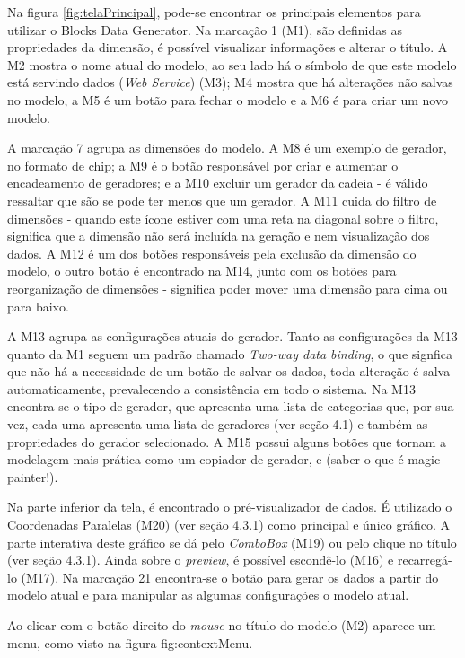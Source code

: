 \documentclass[
	12pt,				%
	openright,			%
	twoside,			%
	a4paper,			%
	english,			%
	brazil				%
	]{abntex2}
\begin{document}
		\par
		Na figura \ref{fig:telaPrincipal}, pode-se encontrar os principais elementos para utilizar o Blocks Data Generator.
		Na marcação 1 (M1), são definidas as propriedades da dimensão, é possível visualizar informações e alterar o título.
		A M2 mostra o nome atual do modelo, ao seu lado há o símbolo de que este modelo está servindo dados (\emph{Web Service}) (M3);
			M4 mostra que há alterações não salvas no modelo, a M5 é um botão para fechar o modelo e a M6 é para criar um novo modelo.
		\par
		A marcação 7 agrupa as dimensões do modelo. 
		A M8 é um exemplo de gerador, no formato de chip; 
			a M9 é o botão responsável por criar e aumentar o encadeamento de geradores; e a M10 excluir um gerador da cadeia - é válido ressaltar que são se pode ter menos que um gerador.
		A M11 cuida do filtro de dimensões - quando este ícone estiver com uma reta na diagonal sobre o filtro, significa que a dimensão não será incluída na geração e nem visualização dos dados.
		A M12 é um dos botões responsáveis pela exclusão da dimensão do modelo, o outro botão é encontrado na M14, junto com os botões para reorganização de dimensões - significa poder mover uma dimensão para cima ou para baixo.
		\par
		A M13 agrupa as configurações atuais do gerador. 
		Tanto as configurações da M13 quanto da M1 seguem um padrão chamado \emph{Two-way data binding}, o que signfica que não há a necessidade de um botão de salvar os dados, toda alteração é salva automaticamente, prevalecendo a consistência em todo o sistema.
		Na M13 encontra-se o tipo de gerador, que apresenta uma lista de categorias que, por sua vez, cada uma apresenta uma lista de geradores (ver seção 4.1) e também as propriedades do gerador selecionado.
		A M15 possui alguns botões que tornam a modelagem mais prática como um copiador de gerador, e (saber o que é magic painter!). 
		\par
		Na parte inferior da tela, é encontrado o pré-visualizador de dados.
		É utilizado o Coordenadas Paralelas (M20) (ver seção 4.3.1) como principal e único gráfico.
		A parte interativa deste gráfico se dá pelo \emph{ComboBox} (M19) ou pelo clique no título (ver seção 4.3.1).
		Ainda sobre o \emph{preview}, é possível escondê-lo (M16) e recarregá-lo (M17).
		Na marcação 21 encontra-se o botão para gerar os dados a partir do modelo atual e para manipular as algumas configurações o modelo atual.
		\par
		Ao clicar com o botão direito do \emph{mouse} no título do modelo (M2) aparece um menu, como visto na figura fig:contextMenu.
\end{document}
